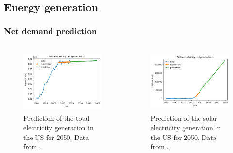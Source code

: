\subsection{Energy generation}
\begin{frame}
\frametitle{Net demand prediction}
\begin{columns}
    \column[t]{5cm}
	\begin{figure}[htbp!]
		\begin{center}
			\includegraphics[height=3.3cm]{images/us-prediction1}
		\end{center}
		\caption{Prediction of the total electricity generation in the US for 2050. Data from \cite{us_energy_information_administration_electric_2020}.}
	\end{figure}

    \column[t]{5cm}
	\begin{figure}[htbp!]
		\begin{center}
			\includegraphics[height=3.3cm]{images/us-prediction2}
		\end{center}
		\caption{Prediction of the solar electricity generation in the US for 2050. Data from \cite{us_energy_information_administration_electric_2020}.}
	\end{figure}
\end{columns}
\end{frame}


